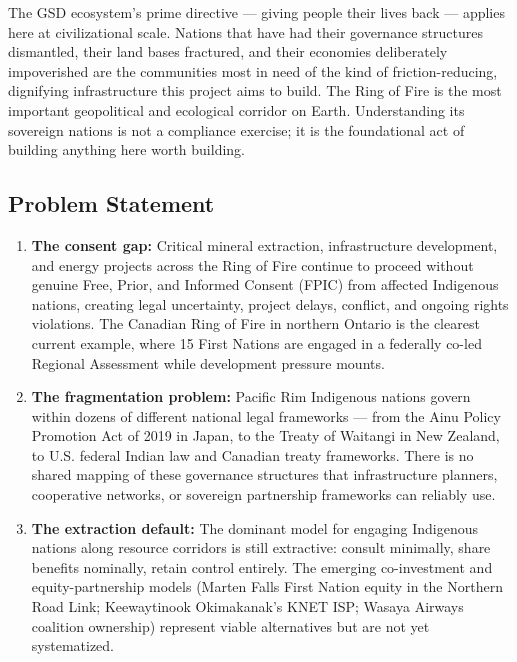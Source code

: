 \documentclass[11pt,letterpaper]{article}
\begin{document}
The GSD ecosystem's prime directive --- giving people their lives back --- applies here at civilizational scale. Nations that have had their governance structures dismantled, their land bases fractured, and their economies deliberately impoverished are the communities most in need of the kind of friction-reducing, dignifying infrastructure this project aims to build. The Ring of Fire is the most important geopolitical and ecological corridor on Earth. Understanding its sovereign nations is not a compliance exercise; it is the foundational act of building anything here worth building.

\subsection{Problem Statement}

\begin{enumerate}
  \item \textbf{The consent gap:} Critical mineral extraction, infrastructure development, and energy projects across the Ring of Fire continue to proceed without genuine Free, Prior, and Informed Consent (FPIC) from affected Indigenous nations, creating legal uncertainty, project delays, conflict, and ongoing rights violations. The Canadian Ring of Fire in northern Ontario is the clearest current example, where 15 First Nations are engaged in a federally co-led Regional Assessment while development pressure mounts.

  \item \textbf{The fragmentation problem:} Pacific Rim Indigenous nations govern within dozens of different national legal frameworks --- from the Ainu Policy Promotion Act of 2019 in Japan, to the Treaty of Waitangi in New Zealand, to U.S. federal Indian law and Canadian treaty frameworks. There is no shared mapping of these governance structures that infrastructure planners, cooperative networks, or sovereign partnership frameworks can reliably use.

  \item \textbf{The extraction default:} The dominant model for engaging Indigenous nations along resource corridors is still extractive: consult minimally, share benefits nominally, retain control entirely. The emerging co-investment and equity-partnership models (Marten Falls First Nation equity in the Northern Road Link; Keewaytinook Okimakanak's KNET ISP; Wasaya Airways coalition ownership) represent viable alternatives but are not yet systematized.


\end{enumerate}
\end{document}
